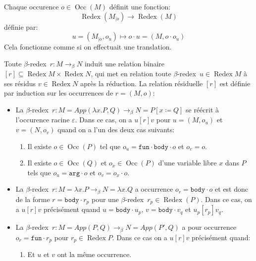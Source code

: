 \documentclass[math, info]{cours}
\def\targ{\texttt{arg}}
\def\tfun{\texttt{fun}}
\def\tbody{\texttt{body}}
\def\walrus{\coloneqq}
\newcommand{\sub}[3]{#1\left[#2\walrus #3\right]}
\def\betaredex{$\beta$-redex\ }
\DeclareMathOperator{\Redex}{Redex}
\DeclareMathOperator{\Occ}{Occ}
\begin{document}
\begin{proposition}
	Chaque occurence $o \in \Occ(M)$ définit une fonction:
	\begin{equation*}
		\Redex(M_{\mid o}) \to \Redex(M)
	\end{equation*}
	définie par:
	\begin{equation*}
		u = (M_{\mid o}, o_{u}) \longmapsto o\cdot u = \left(M, o\cdot o_{u} \right)
	\end{equation*}
	Cela fonctionne comme si on effectuait une translation.
	\label{prop:fonctioninduite}
\end{proposition}

\begin{definition}
	Toute \betaredex $r: M \to_{\beta} N$ induit une relation binaire $[r] \subseteq \Redex M \times \Redex N$,
	qui met en relation toute \betaredex $u \in \Redex M$ à ses résidus $v \in \Redex N$ après la réduction.
	La relation résiduelle $[r]$ est définie par induction sur les occurrences de $r = (M, o)$:
	\begin{itemize}
		\item La \betaredex $r: M = App(\lambda x.P, Q) \to_{\beta} N = \sub{P}{x}{Q}$ se réécrit à l'occurence racine $\varepsilon$.
		      Dans ce cas, on a $u [r] v$ pour $u = (M, o_{u})$ et $v = (N, o_{v})$ quand on a l'un des deux cas suivants:
		      \begin{enumerate}
			      \item Il existe $o \in \Occ(P)$ tel que $o_{u} = \tfun \cdot \tbody \cdot o$ et $o_{v} = o$.
			      \item Il existe $o \in \Occ(Q)$ et $o_{x} \in \Occ(P)$ d'une variable libre $x$ dans $P$ tels que $o_{u} = \targ \cdot o$ et $o_{v} = o_{x} \cdot o$.
		      \end{enumerate}
		\item La \betaredex $r: M = \lambda x. P \to_{\beta} N = \lambda x.Q$ a occurrence $o_{r} = \tbody \cdot o$ et est donc de la forme $r = \tbody \cdot r_{p}$ pour une \betaredex $r_{p} \in \Redex(P)$.
		      Dans ce cas, on a $u [r] v$ précisément quand $u = \tbody \cdot u_{p}$, $v = \tbody \cdot v_{q}$ et $u_{p} [r_{p}] v_{q}$.
		\item La \betaredex $r: M = App(P, Q) \to_{\beta} N = App(P', Q)$ a pour occurrence $o_{r} = \tfun \cdot r_{p}$ pour $r_{p} \in \Redex P$.
		      Dans ce cas on a $u [r] v$ précisément quand:
		      \begin{enumerate}
			      \item Et $u$ et $v$ ont la même occurrence.

\end{enumerate}
\end{itemize}
\end{definition}
\end{document}
